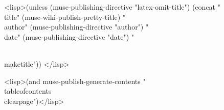 \documentclass{<lisp>(or (muse-publishing-directive "latex-document-class")
  "article")</lisp>}
\begin{document}
<lisp>(unless (muse-publishing-directive "latex-omit-title")
(concat "\\title{" (muse-wiki-publish-pretty-title) "}
\\author{" (muse-publishing-directive "author") "}
\\date{" (muse-publishing-directive "date") "}

\\maketitle"))
</lisp>

<lisp>(and muse-publish-generate-contents
           "\\tableofcontents
\\clearpage")</lisp>
\end{document}
